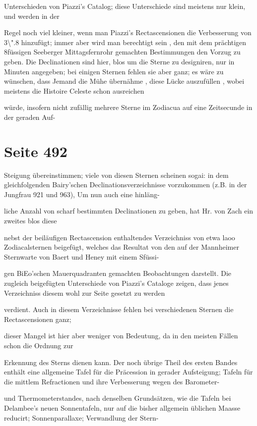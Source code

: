 \documentclass[10pt,a4paper]{article}
\begin{document}
Unterschieden von Piazzi's Catalog; diese Unterschiede sind meistens nur klein, und werden in der

Regel noch viel kleiner, wenn man Piazzi's Rectascensionen die Verbesserung von 3\textbackslash{}".8 hinzufügt; immer aber wird man berechtigt sein , den mit dem prächtigen 8füssigen Seeberger Mittagsfernrohr gemachten Bestimmungen den Vorzug zu geben. Die Declinationen sind hier, blos um die Sterne zu designiren, nur in Minuten angegeben; bei einigen Sternen fehlen sie aber ganz; es wäre zu wünschen, dass Jemand die Mühe übernähme , diese Lücke auszufüllen , wobei meistens die Histoire Celeste schon ausreichen

würde, insofern nicht zufällig mehrere Sterne im Zodiacua auf eine Zeitsecunde in der geraden Auf-


\newpage
\section*{Seite 492}
Steigung übereinstimmen; viele von diesen Sternen scheinen sogai: in dem gleichfolgenden Bairy'schen Declinationsverzeichnisse vorzukommen (z.B. in der Jungfrau 921 und 963), Um nun auch eine hinläng-

liche Anzahl von scharf bestimmten Declinationen zu geben, hat Hr. von Zach ein zweites blos diese

nebst der beiläufigen Rectascension enthaltendes Verzeichniss von etwa laoo Zodiacalsternen beigefügt, welches das Resultat von den auf der Mannheimer Sternwarte von Baert und Heney mit einem Sfüssi-

gen BiEo'schen Mauerquadranten gemachten Beobachtungen darstellt. Die zugleich beigefügten Unterschiede von Piazzi's Cataloge zeigen, dass jenes Verzeichniss diesem wohl zur Seite gesetzt zu werden

verdient. Auch in diesem Verzeichnisse fehlen bei verschiedenen Sternen die Rectascensionen ganz;

dieser Mangel ist hier aber weniger von Bedeutung, da in den meisten Fällen schon die Ordnung zur

Erkennung des Sterns dienen kann. Der noch übrige Theil des ersten Bandes enthält eine allgemeine Tafel für die Präcession in gerader Aufsteigung; Tafeln für die mittlem Refractionen und ihre Verbesserung wegen des Barometer-

und Thermometerstandes, nach denselben Grundsätzen, wie die Tafeln bei Delambee's neuen Sonnentafeln, nur auf die bisher allgemein üblichen Maasse reducirt; Sonnenparallaxe; Verwandlung der Stern-
\end{document}
